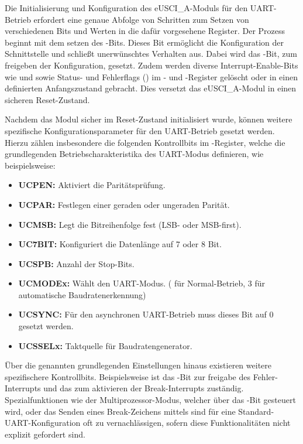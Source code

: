 Die Initialisierung und Konfiguration des eUSCI\_A-Moduls f\"ur den UART-Betrieb erfordert eine genaue Abfolge von Schritten zum Setzen von verschiedenen Bits und Werten in die daf\"ur vorgesehene Register. Der Prozess beginnt mit dem setzen des -Bits. Dieses Bit erm\"oglicht die Konfiguration der Schnittstelle und schließt unerw\"unschtes Verhalten aus. Dabei wird das -Bit, zum freigeben der Konfiguration, gesetzt. Zudem werden diverse Interrupt-Enable-Bits wie  und  sowie Status- und Fehlerflags () im - und -Register gel\"oscht oder in einen definierten Anfangszustand gebracht. Dies versetzt das eUSCI\_A-Modul in einen sicheren Reset-Zustand.

Nachdem das Modul sicher im Reset-Zustand initialisiert wurde, k\"onnen weitere spezifische Konfigurationsparameter f\"ur den UART-Betrieb gesetzt werden. Hierzu z\"ahlen insbesondere die folgenden Kontrollbits im -Register, welche die grundlegenden Betriebscharakteristika des UART-Modus definieren, wie beispielsweise:

\begin{itemize}
	\item \textbf{UCPEN:} Aktiviert die Parit\"atspr\"ufung.
	\item \textbf{UCPAR:} Festlegen einer geraden oder ungeraden Parit\"at.
	\item \textbf{UCMSB:} Legt die Bitreihenfolge fest (LSB- oder MSB-first).
	\item \textbf{UC7BIT:} Konfiguriert die Datenl\"ange auf 7 oder 8 Bit.
	\item \textbf{UCSPB:} Anzahl der Stop-Bits.
	\item \textbf{UCMODEx:} W\"ahlt den UART-Modus. ( f\"ur Normal-Betrieb, 3 f\"ur  automatische Baudratenerkennung)
	\item \textbf{UCSYNC:} F\"ur den asynchronen UART-Betrieb muss dieses Bit auf 0 gesetzt werden.
	\item \textbf{UCSSELx:} Taktquelle f\"ur Baudratengenerator.
\end{itemize}

\"Uber die genannten grundlegenden Einstellungen hinaus existieren weitere spezifischere Kontrollbits. Beispielsweise ist das -Bit zur freigabe des Fehler-Interrupts und das  zum aktivieren der Break-Interrupts zust\"andig. Spezialfunktionen wie der Multiprozessor-Modus, welcher \"uber das -Bit gesteuert wird, oder das Senden eines Break-Zeichens mittels  sind f\"ur eine Standard-UART-Konfiguration oft zu vernachl\"assigen, sofern diese Funktionalit\"aten nicht explizit gefordert sind.

